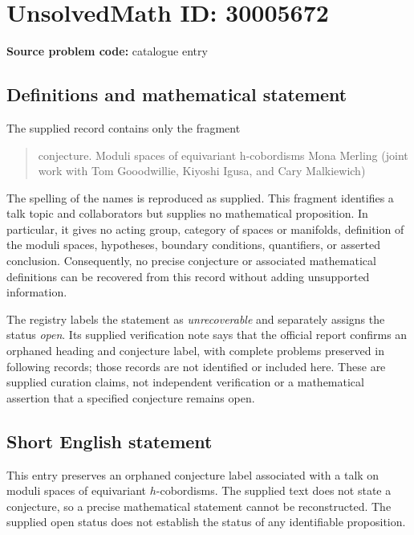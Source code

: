 \documentclass[11pt]{article}
\begin{document}
\section*{UnsolvedMath ID: 30005672}
\textbf{Source problem code:} catalogue entry
\subsection{Definitions and mathematical statement}
The supplied record contains only the fragment
\begin{quote}
conjecture. Moduli spaces of equivariant h-cobordisms Mona Merling (joint work with Tom Gooodwillie, Kiyoshi Igusa, and Cary Malkiewich)
\end{quote}
The spelling of the names is reproduced as supplied. This fragment identifies a talk topic and collaborators but supplies no mathematical proposition. In particular, it gives no acting group, category of spaces or manifolds, definition of the moduli spaces, hypotheses, boundary conditions, quantifiers, or asserted conclusion. Consequently, no precise conjecture or associated mathematical definitions can be recovered from this record without adding unsupported information.

The registry labels the statement as \emph{unrecoverable} and separately assigns the status \emph{open}. Its supplied verification note says that the official report confirms an orphaned heading and conjecture label, with complete problems preserved in following records; those records are not identified or included here. These are supplied curation claims, not independent verification or a mathematical assertion that a specified conjecture remains open.
\subsection{Short English statement}
This entry preserves an orphaned conjecture label associated with a talk on moduli spaces of equivariant \(h\)-cobordisms. The supplied text does not state a conjecture, so a precise mathematical statement cannot be reconstructed. The supplied open status does not establish the status of any identifiable proposition.
\end{document}
